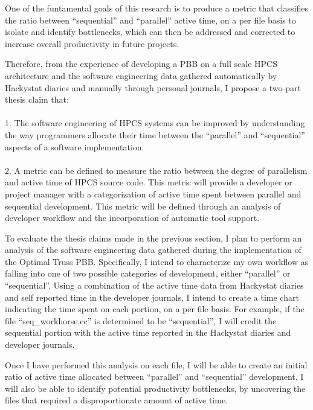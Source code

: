 \documentclass[11pt,twocolumn]{article}
\begin{document}
One of the funtamental goals of this research is to produce a metric
that classifies the ratio between ``sequential'' and ``parallel''
active time, on a per file basis to isolate and identify bottlenecks,
which can then be addressed and corrected to increase overall
productivity in future projects.

Therefore, from the experience of developing a PBB on a full scale HPCS
architecture and the software engineering data gathered automatically
by Hackystat diaries and manually through personal journals, I propose
a two-part thesis claim that:
\\
\\
1. The software engineering of HPCS systems can be improved by
understanding the way programmers allocate their time between the
``parallel'' and ``sequential'' aspects of a software implementation.
\\
\\
2. A metric can be defined to measure the ratio between the degree of
parallelism and active time of HPCS source code.  This metric will
provide a developer or project manager with a categorization of active
time spent between parallel and sequential development.  This metric
will be defined through an analysis of developer workflow and the
incorporation of automatic tool support.

\label{sec:methodology}

To evaluate the thesis claims made in the previous section, I plan to
perform an analysis of the software engineering data gathered during
the implementation of the Optimal Truss PBB.  Specifically, I intend
to characterize my own workflow as falling into one of two possible
categories of development, either ``parallel'' or ``sequential''.
Using a combination of the active time data from Hackystat diaries and
self reported time in the developer journals, I intend to create a
time chart indicating the time spent on each portion, on a per file
basis.  For example, if the file ``seq\_workhorse.cc'' is determined
to be ``sequential'', I will credit the sequential portion with the
active time reported in the Hackystat diaries and developer journals.

Once I have performed this analysis on each file, I will be able to
create an initial ratio of active time allocated between ``parallel''
and ``sequential'' development.  I will also be able to identify
potential productivity bottlenecks, by uncovering the files that
required a disproportionate amount of active time.
\end{document}
